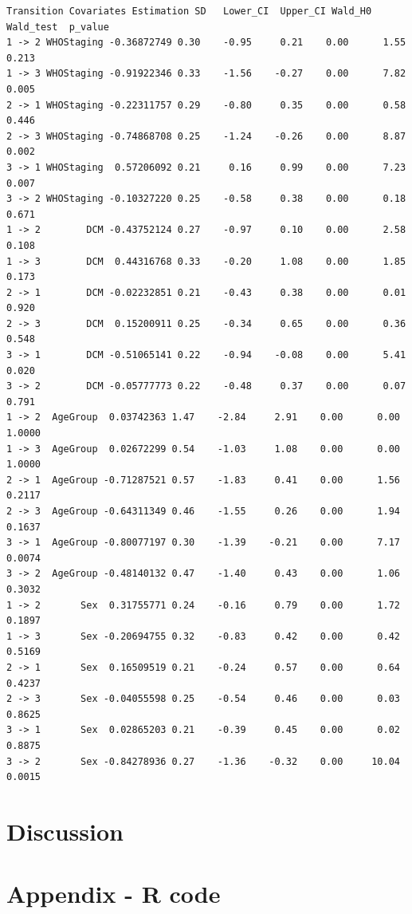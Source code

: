 \documentclass[11pt]{article}
\begin{document}
\begin{verbatim}
Transition Covariates Estimation SD   Lower_CI  Upper_CI Wald_H0 Wald_test  p_value
1 -> 2 WHOStaging -0.36872749 0.30    -0.95     0.21    0.00      1.55  0.213
1 -> 3 WHOStaging -0.91922346 0.33    -1.56    -0.27    0.00      7.82  0.005
2 -> 1 WHOStaging -0.22311757 0.29    -0.80     0.35    0.00      0.58  0.446
2 -> 3 WHOStaging -0.74868708 0.25    -1.24    -0.26    0.00      8.87  0.002
3 -> 1 WHOStaging  0.57206092 0.21     0.16     0.99    0.00      7.23  0.007
3 -> 2 WHOStaging -0.10327220 0.25    -0.58     0.38    0.00      0.18  0.671
1 -> 2        DCM -0.43752124 0.27    -0.97     0.10    0.00      2.58  0.108
1 -> 3        DCM  0.44316768 0.33    -0.20     1.08    0.00      1.85  0.173
2 -> 1        DCM -0.02232851 0.21    -0.43     0.38    0.00      0.01  0.920
2 -> 3        DCM  0.15200911 0.25    -0.34     0.65    0.00      0.36  0.548
3 -> 1        DCM -0.51065141 0.22    -0.94    -0.08    0.00      5.41  0.020
3 -> 2        DCM -0.05777773 0.22    -0.48     0.37    0.00      0.07  0.791
1 -> 2  AgeGroup  0.03742363 1.47    -2.84     2.91    0.00      0.00  1.0000
1 -> 3  AgeGroup  0.02672299 0.54    -1.03     1.08    0.00      0.00  1.0000
2 -> 1  AgeGroup -0.71287521 0.57    -1.83     0.41    0.00      1.56  0.2117
2 -> 3  AgeGroup -0.64311349 0.46    -1.55     0.26    0.00      1.94  0.1637
3 -> 1  AgeGroup -0.80077197 0.30    -1.39    -0.21    0.00      7.17  0.0074
3 -> 2  AgeGroup -0.48140132 0.47    -1.40     0.43    0.00      1.06  0.3032
1 -> 2       Sex  0.31755771 0.24    -0.16     0.79    0.00      1.72  0.1897
1 -> 3       Sex -0.20694755 0.32    -0.83     0.42    0.00      0.42  0.5169
2 -> 1       Sex  0.16509519 0.21    -0.24     0.57    0.00      0.64  0.4237
2 -> 3       Sex -0.04055598 0.25    -0.54     0.46    0.00      0.03  0.8625
3 -> 1       Sex  0.02865203 0.21    -0.39     0.45    0.00      0.02  0.8875
3 -> 2       Sex -0.84278936 0.27    -1.36    -0.32    0.00     10.04  0.0015
\end{verbatim}




	\section{Discussion}\label{discussion}
	
	
	
	\begin{thebibliography}{9}
		
	\end{thebibliography}
	
	\section*{Appendix - R code}\label{appendix}
	
	
\end{document}
